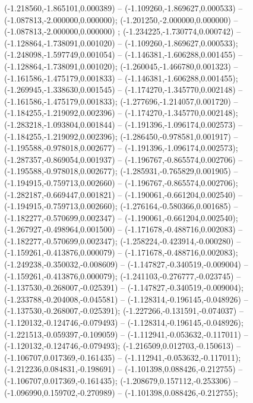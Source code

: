  (-1.218560,-1.865101,0.000389) -- (-1.109260,-1.869627,0.000533) -- (-1.087813,-2.000000,0.000000);
 (-1.201250,-2.000000,0.000000) -- (-1.087813,-2.000000,0.000000) ;
 (-1.234225,-1.730774,0.000742) -- (-1.128864,-1.738091,0.001020) -- (-1.109260,-1.869627,0.000533);
 (-1.248098,-1.597749,0.001054) -- (-1.146381,-1.606288,0.001455) -- (-1.128864,-1.738091,0.001020);
 (-1.260045,-1.466780,0.001323) -- (-1.161586,-1.475179,0.001833) -- (-1.146381,-1.606288,0.001455);
 (-1.269945,-1.338630,0.001545) -- (-1.174270,-1.345770,0.002148) -- (-1.161586,-1.475179,0.001833);
 (-1.277696,-1.214057,0.001720) -- (-1.184255,-1.219092,0.002396) -- (-1.174270,-1.345770,0.002148);
 (-1.283218,-1.093804,0.001844) -- (-1.191396,-1.096174,0.002573) -- (-1.184255,-1.219092,0.002396);
 (-1.286450,-0.978581,0.001917) -- (-1.195588,-0.978018,0.002677) -- (-1.191396,-1.096174,0.002573);
 (-1.287357,-0.869054,0.001937) -- (-1.196767,-0.865574,0.002706) -- (-1.195588,-0.978018,0.002677);
 (-1.285931,-0.765829,0.001905) -- (-1.194915,-0.759713,0.002660) -- (-1.196767,-0.865574,0.002706);
 (-1.282187,-0.669447,0.001821) -- (-1.190061,-0.661204,0.002540) -- (-1.194915,-0.759713,0.002660);
 (-1.276164,-0.580366,0.001685) -- (-1.182277,-0.570699,0.002347) -- (-1.190061,-0.661204,0.002540);
 (-1.267927,-0.498964,0.001500) -- (-1.171678,-0.488716,0.002083) -- (-1.182277,-0.570699,0.002347);
 (-1.258224,-0.423914,-0.000280) -- (-1.159261,-0.413876,0.000079) -- (-1.171678,-0.488716,0.002083);
 (-1.249238,-0.350032,-0.008609) -- (-1.147827,-0.340519,-0.009004) -- (-1.159261,-0.413876,0.000079);
 (-1.241103,-0.276777,-0.023745) -- (-1.137530,-0.268007,-0.025391) -- (-1.147827,-0.340519,-0.009004);
 (-1.233788,-0.204008,-0.045581) -- (-1.128314,-0.196145,-0.048926) -- (-1.137530,-0.268007,-0.025391);
 (-1.227266,-0.131591,-0.074037) -- (-1.120132,-0.124746,-0.079493) -- (-1.128314,-0.196145,-0.048926);
 (-1.221513,-0.059397,-0.109059) -- (-1.112941,-0.053632,-0.117011) -- (-1.120132,-0.124746,-0.079493);
 (-1.216509,0.012703,-0.150613) -- (-1.106707,0.017369,-0.161435) -- (-1.112941,-0.053632,-0.117011);
 (-1.212236,0.084831,-0.198691) -- (-1.101398,0.088426,-0.212755) -- (-1.106707,0.017369,-0.161435);
 (-1.208679,0.157112,-0.253306) -- (-1.096990,0.159702,-0.270989) -- (-1.101398,0.088426,-0.212755);
